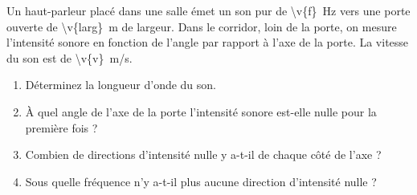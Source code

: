 Un haut-parleur placé dans une salle émet un son pur de \qty{\v{f}}{Hz} vers une porte ouverte de \qty{\v{larg}}{m} de largeur. Dans le corridor, loin de la porte, on mesure l'intensité sonore en fonction de l'angle par rapport à l'axe de la porte. La vitesse du son est de \qty{\v{v}}{m/s}.

\begin{enumerate}[label=\alph*)]
    \item Déterminez la longueur d'onde du son.
    \item À quel angle de l'axe de la porte l'intensité sonore est-elle nulle pour la première fois ?
    \item Combien de directions d'intensité nulle y a-t-il de chaque côté de l'axe ?
    \item Sous quelle fréquence n'y a-t-il plus aucune direction d'intensité nulle ?
\end{enumerate}
